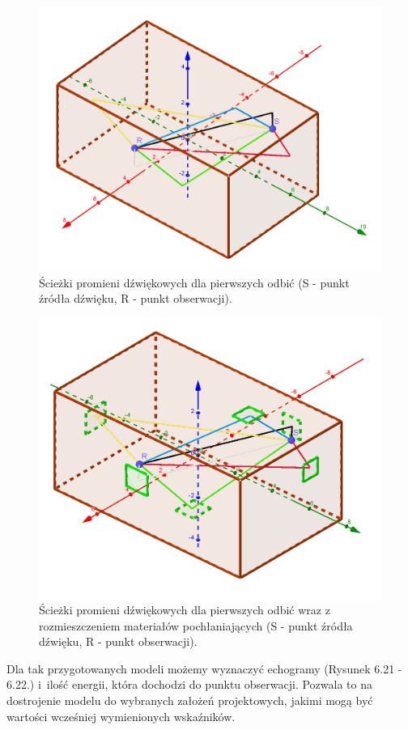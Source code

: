 \begin{figure}[H]
        \centering
                \centering
                \includegraphics[width=12cm]{1szeodbicia}
	\caption{Ścieżki promieni dźwiękowych dla pierwszych odbić (S - punkt źródła dźwięku, R - punkt obserwacji).}
\end{figure}

\begin{figure}[H]
        \centering
                \centering
                \includegraphics[width=12cm]{1odbiciazpoch}
	\caption{Ścieżki promieni dźwiękowych dla pierwszych odbić wraz z rozmieszczeniem materiałów pochłaniających (S - punkt źródła dźwięku, R - punkt obserwacji).}
\end{figure}

Dla tak przygotowanych modeli możemy wyznaczyć echogramy (Rysunek 6.21 - 6.22.) i~ilość energii, która dochodzi do punktu obserwacji. Pozwala to na dostrojenie modelu do wybranych założeń projektowych, jakimi mogą być wartości wcześniej wymienionych wskaźników.

